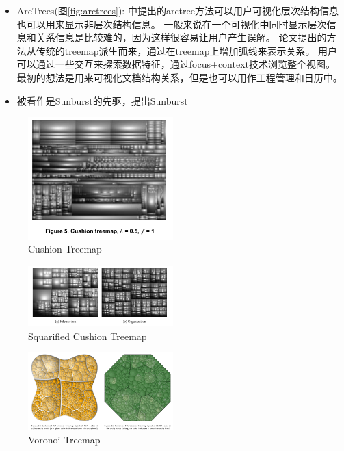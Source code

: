 \documentclass{article}
\begin{document}
\begin{itemize}
	\item ArcTrees(图\ref{fig:arctrees}):
		\cite{neumann2005arctrees}中提出的arctree方法可以用户可视化层次结构信息也可以用来显示非层次结构信息。
		一般来说在一个可视化中同时显示层次信息和关系信息是比较难的，因为这样很容易让用户产生误解。
		论文提出的方法从传统的treemap派生而来，通过在treemap上增加弧线来表示关系。
		用户可以通过一些交互来探索数据特征，通过focus+context技术浏览整个视图。
		最初的想法是用来可视化文档结构关系，但是也可以用作工程管理和日历中。

	\item \cite{andrews1998information}被看作是Sunburst的先驱，\cite{stasko2000focus}提出Sunburst

\end{itemize}

\begin{figure}[h]
	\centering
	\includegraphics[width=0.5\textwidth]{_img/Cushion_Treemap_.png}
	\caption{Cushion Treemap\cite{Wijk1999}}
	\label{fig:cushion_treemap}
\end{figure}

\begin{figure}[h]
	\centering
	\includegraphics[width=0.5\textwidth]{_img/Squarified_Treemap_.png}
	\caption{Squarified Cushion Treemap\cite{Bruls99squarifiedtreemaps}}
	\label{fig:squarified_treemap}
\end{figure}

\begin{figure}[h]
	\centering
	\includegraphics[width=0.5\textwidth]{_img/Voronoi_Treemap_.png}
	\caption{Voronoi Treemap\cite{Balzer_voronoitreemaps}}
	\label{fig:voronoi_treemap}
\end{figure}
\end{document}

